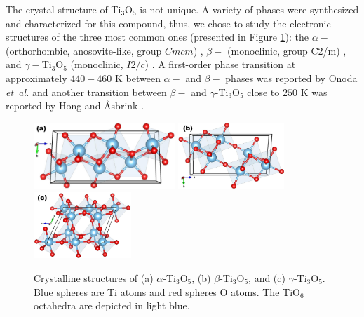 The crystal structure of Ti$_3$O$_5$ is not unique. A variety of phases were synthesized and characterized for this compound, thus, we chose to study the electronic structures of the three most common ones (presented in Figure \ref{fig:struct-ti3o5}): the $\alpha-$ (orthorhombic, anosovite-like, group $Cmcm$) \cite{Rusakov2002}, $\beta-$ (monoclinic, group C2/m) \cite{Asbrink1959,Grey1994}, and $\gamma-$Ti$_3$O$_5$ (monoclinic, $I2/c$) \cite{Hong1982}. A first-order phase transition at approximately $440-460$ K between $\alpha-$ and $\beta-$ phases was reported by Onoda \textit{et\ al.} \cite{Onoda1998} and another transition between $\beta-$ and $\gamma$-Ti$_3$O$_5$ close to $250$ K was reported by Hong and \AA sbrink \cite{Asbrink1959}. 
\begin{center}
  \begin{figure}[ht!]
      \begin{center}
        \includegraphics[height=2.5cm]{img/alpha-ti3o5.jpg}
        \includegraphics[height=2.5cm]{img/beta-ti3o5.jpg}
        \includegraphics[height=2.5cm]{img/gamma-ti3o5.jpg} 
      \end{center}
      \caption{Crystalline structures of (a) $\alpha$-Ti$_3$O$_5$, (b) $\beta$-Ti$_3$O$_5$, and (c) $\gamma$-Ti$_3$O$_5$. Blue spheres are Ti atoms and red spheres O atoms. The TiO$_6$ octahedra are depicted in light blue.}
      \label{fig:struct-ti3o5} 
  \end{figure}
\end{center}

